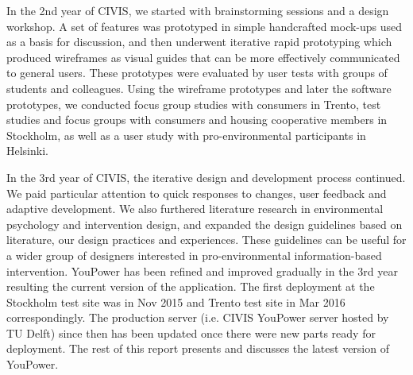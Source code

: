 In the 2nd year of CIVIS, we started with brainstorming sessions and a design workshop. A set of features was prototyped in simple handcrafted mock-ups used as a basis for discussion, and then underwent iterative rapid prototyping which produced wireframes as visual guides that can be more effectively communicated to general users. These prototypes were evaluated by user tests with groups of students and colleagues. Using the wireframe prototypes and later the software prototypes, we conducted focus group studies with consumers in Trento, test studies and focus groups with consumers and housing cooperative members in Stockholm, as well as a user study with pro-environmental participants in Helsinki. 

In the 3rd year of CIVIS, the iterative design and development process continued. We paid particular attention to quick responses to changes, user feedback and adaptive development. We also furthered literature research in environmental psychology and intervention design, and expanded the design guidelines based on literature, our design practices and experiences. These guidelines can be useful for a wider group of designers interested in pro-environmental information-based intervention. YouPower has been refined and improved gradually in the 3rd year resulting the current version of the application. The first deployment at the Stockholm test site was in Nov 2015 and Trento test site in Mar 2016 correspondingly. The production server (i.e. CIVIS YouPower server hosted by TU Delft) since then has been updated once there were new parts ready for deployment.  
The rest of this report presents and discusses the latest version of YouPower. 

 
 

